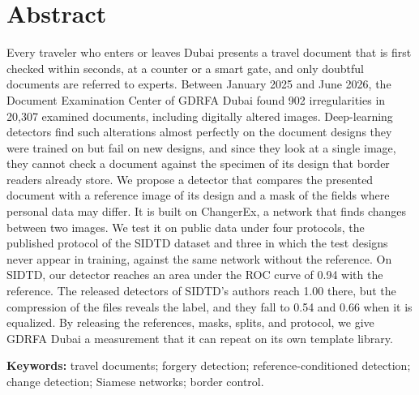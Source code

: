 \documentclass[12pt,a4paper]{article}
\newif\ifshowguidance
\newcommand{\todo}[1]{\ifshowguidance\leavevmode{\color{gray}\itshape [#1]}\fi}
\begin{document}
\section*{Abstract}
\todo{Second draft (10 Oct), about 205 words before the remaining results are filled in; keep it within 250 words.}

Every traveler who enters or leaves Dubai presents a travel document that is first checked within seconds, at a counter or a smart gate, and only doubtful documents are referred to experts. Between January 2025 and June 2026, the Document Examination Center of GDRFA Dubai found 902 irregularities in 20,307 examined documents, including digitally altered images. Deep-learning detectors find such alterations almost perfectly on the document designs they were trained on but fail on new designs, and since they look at a single image, they cannot check a document against the specimen of its design that border readers already store. We propose a detector that compares the presented document with a reference image of its design and a mask of the fields where personal data may differ. It is built on ChangerEx, a network that finds changes between two images. We test it on public data under four protocols, the published protocol of the SIDTD dataset and three in which the test designs never appear in training, against the same network without the reference. On SIDTD, our detector reaches an area under the ROC curve of 0.94 with the reference. The released detectors of SIDTD's authors reach 1.00 there, but the compression of the files reveals the label, and they fall to 0.54 and 0.66 when it is equalized. \todo{Gain over the same network without the reference, once the fair control is in, the results on unseen designs (Protocols B to D), and the referral rate at a fixed miss rate.} \todo{CPU time per document.} By releasing the references, masks, splits, and protocol, we give GDRFA Dubai a measurement that it can repeat on its own template library.

\textbf{Keywords:} travel documents; forgery detection; reference-conditioned detection; change detection; Siamese networks; border control.

\clearpage

\end{document}
